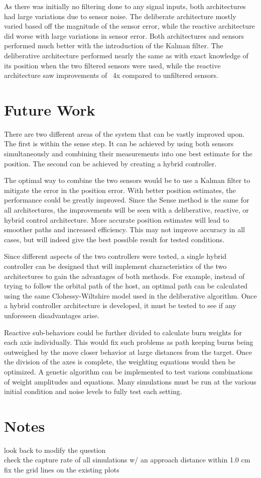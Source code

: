 \documentclass[journal, 10pt]{IEEEtran}
\begin{document}
As there was initially no filtering done to any signal inputs, both architectures had large variations due to sensor noise. The deliberate architecture mostly varied based off the magnitude of the sensor error, while the reactive architecture did worse with large variations in sensor error. Both architectures and sensors performed much better with the introduction of the Kalman filter. The deliberative architecture performed nearly the same as with exact knowledge of its position when the two filtered sensors were used, while the reactive architecture saw improvements of ~4x compared to unfiltered sensors.


\section{Future Work}
There are two different areas of the system that can be vastly improved upon.  The first is within the sense step.  It can be achieved by using both sensors simultaneously and combining their measurements into one best estimate for the position.  The second can be achieved by creating a hybrid controller.

The optimal way to combine the two sensors would be to use a Kalman filter to mitigate the error in the position error.  With better position estimates, the performance could be greatly improved.  Since the Sense method is the same for all architectures, the improvements will be seen with a deliberative, reactive, or hybrid control architecture.  More accurate position estimates will lead to smoother paths and increased efficiency. This may not improve accuracy in all cases, but will indeed give the best possible result for tested conditions.

Since different aspects of the two controllers were tested, a single hybrid controller can be designed that will implement characteristics of the two architectures to gain the advantages of both methods.  For example, instead of trying to follow the orbital path of the host, an optimal path can be calculated using the same Clohessy-Wiltshire model used in the deliberative algorithm.  Once a hybrid controller architecture is developed, it must be tested to see if any unforeseen disadvantages arise.

Reactive sub-behaviors could be further divided to calculate burn weights for each axis individually.  This would fix such problems as path keeping burns being outweighed by the move closer behavior at large distances from the target.  Once the division of the axes is complete, the weighting equations would then be optimized.  A genetic algorithm can be implemented to test various combinations of weight amplitudes and equations.  Many simulations must be run at the various initial condition and noise levels to fully test each setting.

\section{Notes}
look back to modify the question \\
check the capture rate of all simulations w/ an approach distance within 1.0 cm \\
fix the grid lines on the existing plots
\nocite{*}

{}
\end{document}
